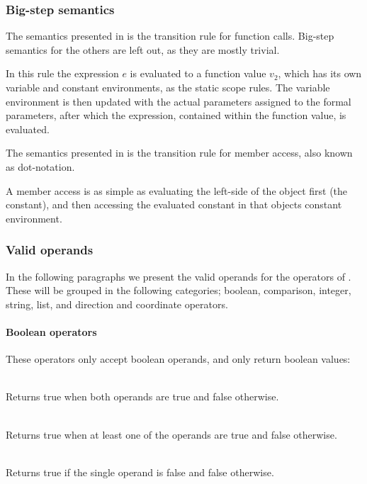 \subsubsection{Big-step semantics}

The semantics presented in  is the transition
rule for function calls. Big-step semantics for the others are left out,
as they are mostly trivial.



In this rule the expression $e$ is evaluated to a function value $v_2$, which
has its own variable and constant environments, as the static scope rules.
The variable environment is then updated with the actual parameters assigned to
the formal parameters, after which the expression, contained within the function
value, is evaluated.

The semantics presented in  is the transition rule
for member access, also known as dot-notation.



A member access is as simple as evaluating the left-side of the object
first (the constant), and then accessing the evaluated constant in that
objects constant environment.

\subsubsection{Valid operands}
\label{sec:validoperands}
In the following paragraphs we present the valid operands for the operators of
\productname{}. These will be grouped in the following categories; boolean,
comparison, integer, string, list, and direction and coordinate operators.

\paragraph{Boolean operators}

These operators only accept boolean operands, and only return boolean values:

\begin{dlist}
  \item {}\\
    Returns true when both operands are true and false otherwise. 
  \item {}\\
    Returns true when at least one of the operands are true and false otherwise.
  \item {}\\
    Returns true if the single operand is false and false otherwise.
\end{dlist}

